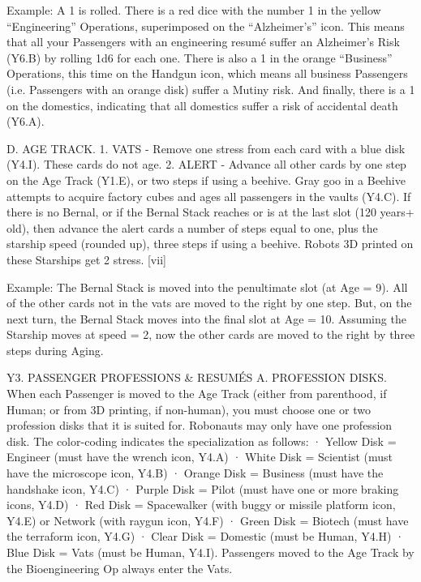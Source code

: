 \documentclass[a4paper]{book}
\begin{document}
Example: A 1 is rolled. There is a red dice with the number 1 in the yellow “Engineering” Operations, superimposed on the “Alzheimer’s” icon. This means that all your Passengers with an engineering resumé suffer an Alzheimer’s Risk (Y6.B) by rolling 1d6 for each one. There is also a 1 in the orange “Business” Operations, this time on the Handgun icon, which means all business Passengers (i.e. Passengers with an orange disk) suffer a Mutiny risk. And finally, there is a 1 on the domestics, indicating that all domestics suffer a risk of accidental death (Y6.A).
 
D. AGE TRACK.
1. VATS - Remove one stress from each card with a blue disk (Y4.I). These cards do not age.
2. ALERT - Advance all other cards by one step on the Age Track (Y1.E), or two steps if using a beehive. Gray goo in a Beehive attempts to acquire factory cubes and ages all passengers in the vaults (Y4.C). If there is no Bernal, or if the Bernal Stack reaches or is at the last slot (120 years+ old), then advance the alert cards a number of steps equal to one, plus the starship speed (rounded up), three steps if using a beehive. Robots 3D printed on these Starships get 2 stress. [vii]
 
Example: The Bernal Stack is moved into the penultimate slot (at Age = 9). All of the other cards not in the vats are moved to the right by one step. But, on the next turn, the Bernal Stack moves into the final slot at Age = 10. Assuming the Starship moves at speed = 2, now the other cards are moved to the right by three steps during Aging.
 
Y3. PASSENGER PROFESSIONS \& RESUMÉS
A. PROFESSION DISKS. When each Passenger is moved to the Age Track (either from parenthood, if Human; or from 3D printing, if non-human), you must choose one or two profession disks that it is suited for. Robonauts may only have one profession disk. The color-coding indicates the specialization as follows:
·       Yellow Disk = Engineer (must have the wrench icon, Y4.A)
·       White Disk = Scientist (must have the microscope icon, Y4.B)
·       Orange Disk = Business (must have the handshake icon, Y4.C)
·       Purple Disk = Pilot (must have one or more braking icons, Y4.D)
·       Red Disk = Spacewalker (with buggy or missile platform icon, Y4.E) or Network (with raygun icon, Y4.F)
·       Green Disk = Biotech (must have the terraform icon, Y4.G)
·       Clear Disk = Domestic (must be Human, Y4.H)
·       Blue Disk = Vats (must be Human, Y4.I).  Passengers moved to the Age Track by the  Bioengineering Op always enter the Vats.
\end{document}
